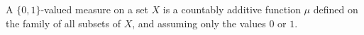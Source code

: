 A $\{0,1\}$-valued measure on a set $X$ is a countably additive function $\mu$ defined on the family of all subsets of $X$, and assuming only the values $0$ or $1$.